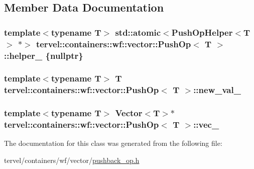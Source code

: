 \subsection{Member Data Documentation}
\hypertarget{classtervel_1_1containers_1_1wf_1_1vector_1_1_push_op_a285817a3099b8cda383eaf8f514d3496}{}
\subsubsection[{helper\+\_\+}]{\setlength{\rightskip}{0pt plus 5cm}template$<$typename T$>$ std\+::atomic$<${\bf Push\+Op\+Helper}$<$T$>$ $\ast$$>$ {\bf tervel\+::containers\+::wf\+::vector\+::\+Push\+Op}$<$ T $>$\+::helper\+\_\+ \{nullptr\}\hspace{0.3cm}{\ttfamily [private]}}\label{classtervel_1_1containers_1_1wf_1_1vector_1_1_push_op_a285817a3099b8cda383eaf8f514d3496}
\hypertarget{classtervel_1_1containers_1_1wf_1_1vector_1_1_push_op_a7e4e5a4d2436799e0b31bb82e0b4a0f6}{}
\subsubsection[{new\+\_\+val\+\_\+}]{\setlength{\rightskip}{0pt plus 5cm}template$<$typename T$>$ T {\bf tervel\+::containers\+::wf\+::vector\+::\+Push\+Op}$<$ T $>$\+::new\+\_\+val\+\_\+\hspace{0.3cm}{\ttfamily [private]}}\label{classtervel_1_1containers_1_1wf_1_1vector_1_1_push_op_a7e4e5a4d2436799e0b31bb82e0b4a0f6}
\hypertarget{classtervel_1_1containers_1_1wf_1_1vector_1_1_push_op_ace670d6d64e1f884f6213135d32d6dbe}{}
\subsubsection[{vec\+\_\+}]{\setlength{\rightskip}{0pt plus 5cm}template$<$typename T$>$ Vector$<$T$>$$\ast$ {\bf tervel\+::containers\+::wf\+::vector\+::\+Push\+Op}$<$ T $>$\+::vec\+\_\+\hspace{0.3cm}{\ttfamily [private]}}\label{classtervel_1_1containers_1_1wf_1_1vector_1_1_push_op_ace670d6d64e1f884f6213135d32d6dbe}


The documentation for this class was generated from the following file\+:\begin{DoxyCompactItemize}
\item 
tervel/containers/wf/vector/\hyperlink{pushback__op_8h}{pushback\+\_\+op.\+h}\end{DoxyCompactItemize}
